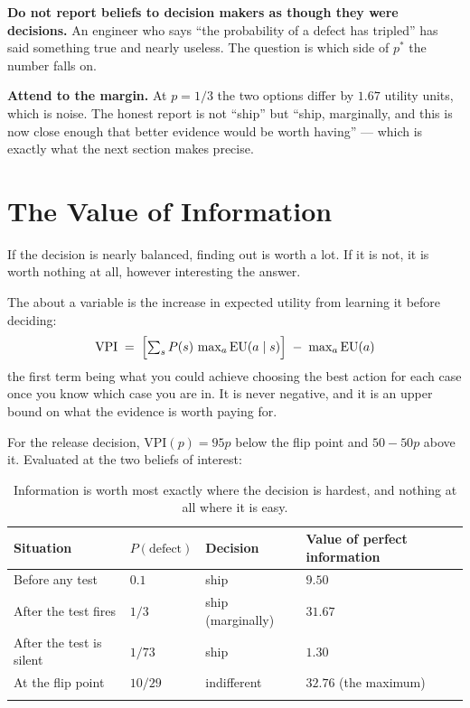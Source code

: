 \textbf{Do not report beliefs to decision makers as though they were decisions.} An
engineer who says ``the probability of a defect has tripled'' has said something
true and nearly useless. The question is which side of $p^{*}$ the number falls on.

\textbf{Attend to the margin.} At $p = 1/3$ the two options differ by $1.67$ utility
units, which is noise. The honest report is not ``ship'' but ``ship, marginally, and
this is now close enough that better evidence would be worth having'' --- which is
exactly what the next section makes precise.

\section{The Value of Information}

If the decision is nearly balanced, finding out is worth a lot. If it is not, it is
worth nothing at all, however interesting the answer.

\begin{definitionbox}
The  about a variable is the increase in
expected utility from learning it before deciding:
\[
  \mathrm{VPI} \;=\; \Bigl[\textstyle\sum_{s} P(s)\, \max_{a} \mathrm{EU}(a \mid s)
  \Bigr] \;-\; \max_{a} \mathrm{EU}(a)
\]
the first term being what you could achieve choosing the best action for each case
once you know which case you are in. It is never negative, and it is an upper bound
on what the evidence is worth paying for.
\end{definitionbox}

For the release decision, $\mathrm{VPI}(p) = 95p$ below the flip point and
$50 - 50p$ above it. Evaluated at the two beliefs of interest:

\smallskip
\noindent\begin{longtable}{@{}L{4.6cm}L{2.6cm}L{2.6cm}L{4.4cm}@{}}
\toprule
{}
\textbf{Situation} & \textbf{$P(\text{defect})$} & \textbf{Decision} &
\textbf{Value of perfect information} \\
\midrule
\endhead
Before any test & $0.1$ & ship & $9.50$ \\
After the test fires & $1/3$ & ship (marginally) & $\mathbf{31.67}$ \\
After the test is silent & $1/73$ & ship & $1.30$ \\
At the flip point & $10/29$ & indifferent & $32.76$ (the maximum) \\
\bottomrule
\caption{Information is worth most exactly where the decision is hardest, and
nothing at all where it is easy.}\label{tab:vpi}
\end{longtable}

